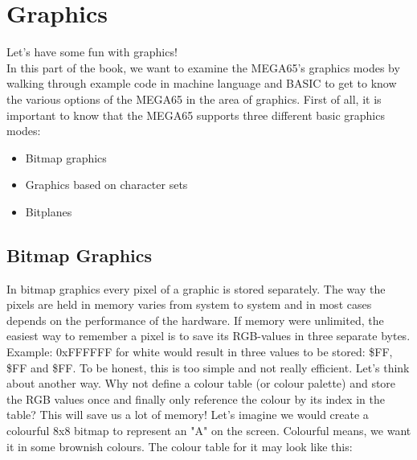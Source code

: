 
\newcommand{\blkb}{\cellcolor[rgb]{0,0,0}\textcolor{white} 0 }
\newcommand{\bwn}{\cellcolor[rgb]{.26,.22,0}\textcolor{white} 9 }
\newcommand{\ora}{\cellcolor[rgb]{.44,.31,.15}8 }
\newcommand{\red}{\cellcolor[rgb]{.6,.4,.35}A }
\newcommand{\lgr}{\cellcolor[rgb]{.58,.58,.58}F }
\newcommand{\yel}{\cellcolor[rgb]{1.,.95,0.}7 }

\newcommand{\redb}{\cellcolor[rgb]{.6,.4,.35} 1 }

\chapter{Graphics}
\label{cha:graphics}

Let's have some fun with graphics! \\
In this part of the book, we want to examine the MEGA65's graphics modes by walking through example code in machine language and BASIC to get to know the various options of the MEGA65 in the area of graphics. First of all, it is important to know that the MEGA65 supports three different basic graphics modes:

\begin{itemize}
	\item Bitmap graphics
	\item Graphics based on character sets
	\item Bitplanes
\end{itemize}


\section*{Bitmap Graphics}

In bitmap graphics every pixel of a graphic is stored separately. The way the pixels are held in memory varies from system to system and in most cases depends on the performance of the hardware. If memory were unlimited, the easiest way to remember a pixel is to save its RGB-values in three separate bytes. Example: 0xFFFFFF for white would result in three values to be stored: \$FF, \$FF and \$FF. To be honest, this is too simple and not really efficient. Let’s think about another way. Why not define a colour table (or colour palette) and store the RGB values once and finally only reference the colour by its index in the table? This will save us a lot of memory! Let's imagine we would create a colourful 8x8 bitmap to represent an "A" on the screen. Colourful means, we want it in some brownish colours. The colour table for it may look like this:

